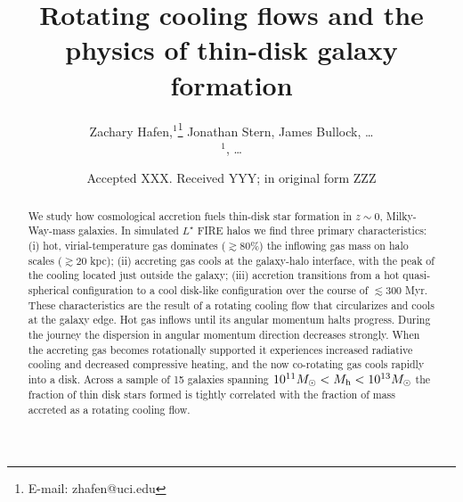 \documentclass[fleqn,usenatbib]{mnras}
\title[Rotating cooling flows and thin disks]{Rotating cooling flows and the physics of thin-disk galaxy formation}
\author[Hafen, Stern, Bullock et al.]{
Zachary Hafen,$^{1}$\thanks{E-mail: zhafen@uci.edu}
Jonathan Stern,
James Bullock,
\ldots
\\
$^1$,
\ldots
}
\date{Accepted XXX. Received YYY; in original form ZZZ}
\begin{document}
\label{firstpage}
\pagerange{\pageref{firstpage}--\pageref{lastpage}}
\maketitle

\begin{abstract}
We study how cosmological accretion fuels thin-disk star formation in $z\sim 0$, Milky-Way-mass galaxies.
In simulated $L^\star$ FIRE halos we find three primary characteristics:
(i) hot, virial-temperature gas dominates ($\gtrsim80\%$) the inflowing gas mass on halo scales ($\gtrsim 20$ kpc);
(ii) accreting gas cools at the galaxy-halo interface, with the peak of the cooling located just outside the galaxy;
(iii) accretion transitions from a hot quasi-spherical configuration to a cool disk-like configuration over the course of $\lesssim 300$ Myr.
These characteristics are the result of a rotating cooling flow that circularizes and cools at the galaxy edge.
Hot gas inflows until its angular momentum halts progress.
During the journey the dispersion in angular momentum direction decreases strongly.
When the accreting gas becomes rotationally supported it experiences increased radiative cooling and decreased compressive heating, and the now co-rotating gas cools rapidly into a disk.
Across a sample of 15 galaxies spanning $10^{11} M_\odot < M_{\rm h} < 10^{13} M_\odot$ the fraction of thin disk stars formed is tightly correlated with the fraction of mass accreted as a rotating cooling flow.
\end{abstract}

\end{document}
